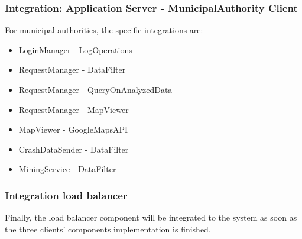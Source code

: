 \subsubsection{Integration: Application Server - MunicipalAuthority Client}
For municipal authorities, the specific integrations are:
\begin{itemize}
	\item LoginManager - LogOperations
	\item RequestManager - DataFilter
	\item RequestManager - QueryOnAnalyzedData
	\item RequestManager - MapViewer 
	\item MapViewer - GoogleMapsAPI
	\item CrashDataSender - DataFilter	
	\item MiningService - DataFilter
\end{itemize}

\subsubsection{Integration load balancer}
Finally, the load balancer component will be integrated to the system as soon as the three clients' components implementation is finished.